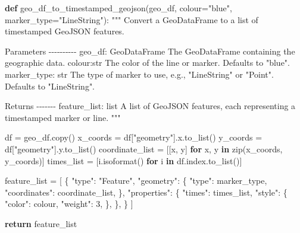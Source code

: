 \documentclass[
  letterpaper,
  DIV=11,
  numbers=noendperiod]{scrreprt}
\newenvironment{Shaded}{\begin{snugshade}}{\end{snugshade}}
\newcommand{\BuiltInTok}[1]{\textcolor[rgb]{0.00,0.23,0.31}{#1}}
\newcommand{\CommentTok}[1]{\textcolor[rgb]{0.37,0.37,0.37}{#1}}
\newcommand{\ControlFlowTok}[1]{\textcolor[rgb]{0.00,0.23,0.31}{\textbf{#1}}}
\newcommand{\DecValTok}[1]{\textcolor[rgb]{0.68,0.00,0.00}{#1}}
\newcommand{\KeywordTok}[1]{\textcolor[rgb]{0.00,0.23,0.31}{\textbf{#1}}}
\newcommand{\NormalTok}[1]{\textcolor[rgb]{0.00,0.23,0.31}{#1}}
\newcommand{\OperatorTok}[1]{\textcolor[rgb]{0.37,0.37,0.37}{#1}}
\newcommand{\StringTok}[1]{\textcolor[rgb]{0.13,0.47,0.30}{#1}}
\begin{document}
\begin{Shaded}
\begin{Highlighting}[]
\KeywordTok{def}\NormalTok{ geo\_df\_to\_timestamped\_geojson(geo\_df, colour}\OperatorTok{=}\StringTok{"blue"}\NormalTok{, marker\_type}\OperatorTok{=}\StringTok{"LineString"}\NormalTok{):}
    \CommentTok{"""}
\CommentTok{    Convert a GeoDataFrame to a list of timestamped GeoJSON features.}

\CommentTok{    Parameters}
\CommentTok{    {-}{-}{-}{-}{-}{-}{-}{-}{-}{-}}
\CommentTok{        geo\_df: GeoDataFrame}
\CommentTok{            The GeoDataFrame containing the geographic data.}
\CommentTok{        colour:str}
\CommentTok{            The color of the line or marker. Defaults to "blue".}
\CommentTok{        marker\_type: str}
\CommentTok{            The type of marker to use, e.g., "LineString" or "Point". Defaults to "LineString".}

\CommentTok{    Returns}
\CommentTok{    {-}{-}{-}{-}{-}{-}{-}}
\CommentTok{        feature\_list: list}
\CommentTok{            A list of GeoJSON features, each representing a timestamped marker or line.}
\CommentTok{    """}

\NormalTok{    df }\OperatorTok{=}\NormalTok{ geo\_df.copy()}
\NormalTok{    x\_coords }\OperatorTok{=}\NormalTok{ df[}\StringTok{"geometry"}\NormalTok{].x.to\_list()}
\NormalTok{    y\_coords }\OperatorTok{=}\NormalTok{ df[}\StringTok{"geometry"}\NormalTok{].y.to\_list()}
\NormalTok{    coordinate\_list }\OperatorTok{=}\NormalTok{ [[x, y] }\ControlFlowTok{for}\NormalTok{ x, y }\KeywordTok{in} \BuiltInTok{zip}\NormalTok{(x\_coords, y\_coords)]}
\NormalTok{    times\_list }\OperatorTok{=}\NormalTok{ [i.isoformat() }\ControlFlowTok{for}\NormalTok{ i }\KeywordTok{in}\NormalTok{ df.index.to\_list()]}
    
\NormalTok{    feature\_list }\OperatorTok{=}\NormalTok{ [}
\NormalTok{       \{}
           \StringTok{"type"}\NormalTok{: }\StringTok{"Feature"}\NormalTok{,}
           \StringTok{"geometry"}\NormalTok{: \{}
               \StringTok{"type"}\NormalTok{: marker\_type,}
               \StringTok{"coordinates"}\NormalTok{: coordinate\_list,}
\NormalTok{           \},}
           \StringTok{"properties"}\NormalTok{: \{}
               \StringTok{"times"}\NormalTok{: times\_list,}
               \StringTok{"style"}\NormalTok{: \{}
                   \StringTok{"color"}\NormalTok{: colour,}
                   \StringTok{"weight"}\NormalTok{: }\DecValTok{3}\NormalTok{,}
\NormalTok{               \},}
\NormalTok{           \},}
\NormalTok{       \}}
\NormalTok{    ]}
    
    \ControlFlowTok{return}\NormalTok{ feature\_list}
\end{Highlighting}
\end{Shaded}
\end{document}
